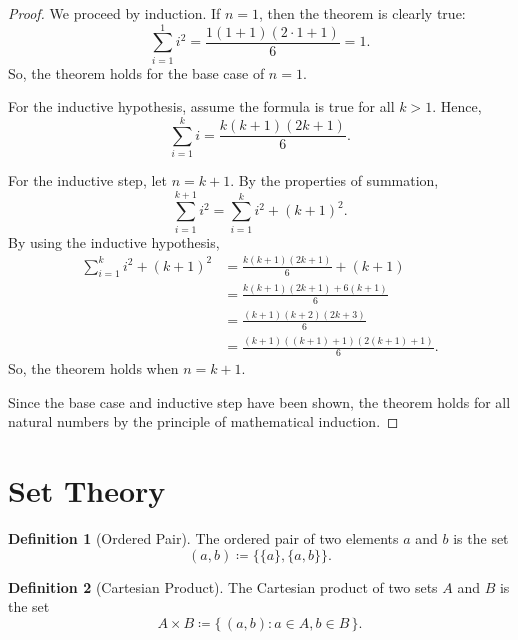 \documentclass[headings=standardclasses]{scrartcl}
\theoremstyle{definition}
\newtheorem{definition}{Definition}[subsection]
\begin{document}
\begin{proof}
  We proceed by induction. If \(n = 1\), then the theorem is clearly true:
  \begin{equation*}
    ∑_{i = 1}^1 i^2 = \frac{1(1 + 1)(2 ⋅1 + 1)}{6} = 1.
  \end{equation*}
  So, the theorem holds for the base case of \(n = 1\).

  For the inductive hypothesis, assume the formula is true for all \(k > 1\).
  Hence,
  \begin{equation*}
    ∑_{i = 1}^k i = \frac{k(k + 1)(2k + 1)}{6}.
  \end{equation*}

  For the inductive step, let \(n = k + 1\). By the properties of summation,
  \begin{equation*}
    ∑_{i = 1}^{k + 1} i^2 = ∑_{i = 1}^k i^2 + {(k + 1)}^2.
  \end{equation*}
  By using the inductive hypothesis,
  \begin{equation*}
  \begin{split}
    ∑_{i = 1}^k i^2 + {(k + 1)}^2 &= \frac{k(k + 1)(2k + 1)}{6} + (k + 1) \\
                                  &= \frac{k(k + 1)(2k + 1) + 6(k + 1)}{6} \\
                                  &= \frac{(k + 1)(k + 2)(2k + 3)}{6} \\
                                  &= \frac{(k + 1)((k + 1) + 1)(2(k + 1) + 1)}{6}.
  \end{split}
  \end{equation*}
  So, the theorem holds when \(n = k + 1\).

  Since the base case and inductive step have been shown, the theorem holds for
  all natural numbers by the principle of mathematical induction.
\end{proof}

\section{Set Theory}

\begin{definition}[Ordered Pair]\label{def:ordered_pair}
  The ordered pair of two elements \(a\) and \(b\) is the set
  \[ (a, b) ≔ \{\{a\}, \{a, b\}\}. \]
\end{definition}

\begin{definition}[Cartesian Product]\label{def:cartesian_product}
  The Cartesian product of two sets \(A\) and \(B\) is the set
  \[ A × B ≔ \{\, (a, b) : a ∈ A, b ∈ B \,\}. \]
\end{definition}
\end{document}
